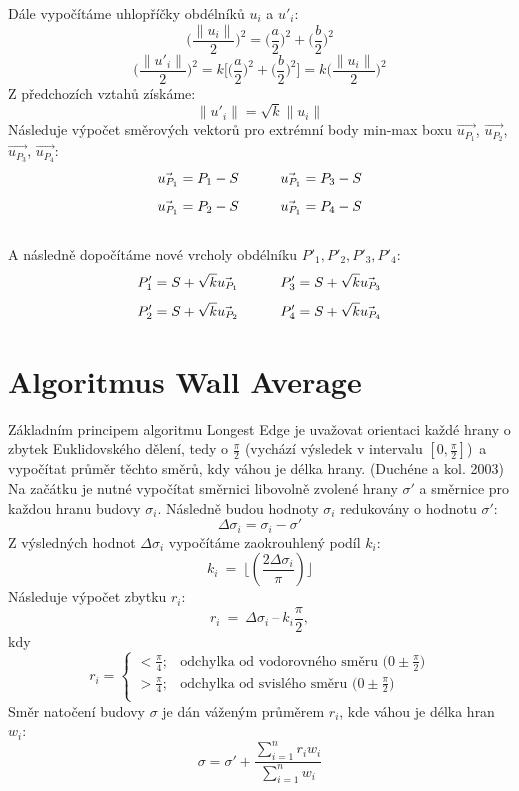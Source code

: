 \documentclass{article}
\begin{document}
Dále vypočítáme uhlopříčky obdélníků $u_{i}$ a $u'_{i}$:
\[\bigg(\frac{\|u_{i}\|}{2}\bigg)^2 = \bigg({\frac{a}{2}}\bigg)^2 + \bigg({\frac{b}{2}}\bigg)^2\]
\[\bigg(\frac{\|u'_{i}\|}{2}\bigg)^2 = k\bigg[\bigg({\frac{a}{2}}\bigg)^2 + \bigg(\frac{b}{2}\bigg)^2\bigg] = k\bigg(\frac{\|u_{i}\|}{2}\bigg)^2\]
Z předchozích vztahů získáme:
\[\|u'_{i}\| = \sqrt{k}\|u_{i}\|\]
Následuje výpočet směrových vektorů pro extrémní body min-max boxu $\Vec{u_{P_{1}}}$, $\Vec{u_{P_{2}}}$, $\Vec{u_{P_{3}}}$, $\Vec{u_{P_{4}}}$:
\[\Vec{u_{P_{1}}} = P_{1} - S\indent\indent\Vec{u_{P_{1}}} = P_{3} - S\]
\[\Vec{u_{P_{1}}} = P_{2} - S\indent\indent\Vec{u_{P_{1}}} = P_{4} - S\]
\vspace{0.3cm}\\
A následně dopočítáme nové vrcholy obdélníku $P'_{1}, P'_{2}, P'_{3}, P'_{4}$:
\[P'_{1} = S + \sqrt{k}\Vec{u_{P_{1}}}\indent\indent P'_{3} = S + \sqrt{k}\Vec{u_{P_{3}}}\]
\[P'_{2} = S + \sqrt{k}\Vec{u_{P_{2}}}\indent\indent P'_{4} = S + \sqrt{k}\Vec{u_{P_{4}}}\]
\section{\small{Algoritmus Wall Average}}
Základním principem algoritmu Longest Edge je uvažovat orientaci každé hrany o zbytek Euklidovského dělení, tedy o $\frac{\pi}{2}$ (vychází výsledek v intervalu $\left[0, \frac{\pi}{2}\right]$)\ a vypočítat průměr těchto směrů, kdy váhou je délka hrany. (Duchéne a kol. 2003)
Na začátku je nutné vypočítat směrnici libovolně zvolené hrany $\sigma'$ a směrnice pro každou hranu budovy $\sigma_{i}$. Následně budou hodnoty $\sigma_{i}$ redukovány o hodnotu $\sigma'$:
\[\Delta\sigma_{i} = \sigma_{i} - \sigma'\]
Z výsledných hodnot $\Delta\sigma_{i}$ vypočítáme zaokrouhlený podíl $k_{i}$:
\[k_{i}~=~\lfloor(\frac{2\Delta\sigma_{i}}{\pi})\rfloor\]
Následuje výpočet zbytku $r_{i}$:
\[r_{i}~=~\Delta\sigma_{i}~–~k_{i}\frac{\pi}{2},\]
kdy \begin{equation}
    r_{i} = \begin{cases}
            < \frac{\pi}{4}; & \text{odchylka od vodorovného směru ($0 \pm \frac{\pi}{2})$}\\
            > \frac{\pi}{4}; & \text{odchylka od svislého směru ($0 \pm \frac{\pi}{2})$}\\
    \end{cases}
\end{equation}
Směr natočení budovy $\sigma$ je dán váženým průměrem $r_{i}$, kde váhou je délka hran $w_{i}$:
\[\sigma = \sigma' + \frac{\sum_{i=1}^{n}r_{i}w_{i}}{\sum_{i=1}^{n}w_{i}}\]
\end{document}
